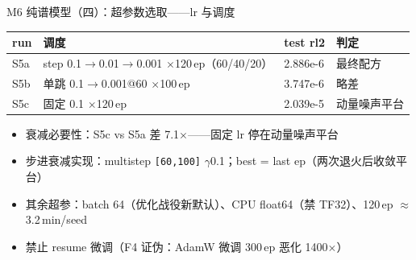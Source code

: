\documentclass[aspectratio=169]{beamer}
\newcommand{\pos}[1]{\textcolor{blue!70!black}{#1}}
\newcommand{\con}[1]{\textcolor{orange!85!black}{#1}}
\newcommand{\HL}[1]{\textcolor{green!45!black}{#1}}
\begin{document}
\begin{frame}{M6 纯谱模型（四）：超参数选取——lr 与调度}
  \begin{table}
    \centering
    \begin{tabular}{llll}
      \toprule
      run & 调度 & test rl2 & 判定 \\
      \midrule
      \HL{S5a} & step \pos{0.1$\to$0.01$\to$0.001} $\times$120\,ep（60/40/20） & \HL{2.886e-6} & \HL{最终配方} \\
      S5b & 单跳 0.1$\to$0.001@60 $\times$100\,ep & 3.747e-6 & 略差 \\
      S5c & 固定 0.1 $\times$120\,ep & \con{2.039e-5} & \con{动量噪声平台} \\
      \bottomrule
    \end{tabular}
  \end{table}
  \begin{itemize}
    \item \pos{衰减必要性}：S5c vs S5a 差 7.1$\times$——固定 lr 停在动量噪声平台
    \item 步进衰减实现：multistep \texttt{[60,100]} $\gamma$0.1；best = last ep（两次退火后收敛平台）
    \item 其余超参：batch 64（优化战役新默认）、CPU float64（禁 TF32）、120\,ep $\approx$ 3.2\,min/seed
    \item 禁止 resume 微调（F4 证伪：AdamW 微调 300\,ep 恶化 1400$\times$）
  \end{itemize}
\end{frame}
\end{document}
